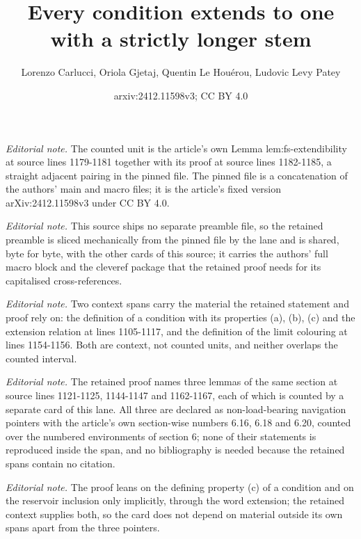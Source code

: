 \documentclass{article}
\title{Every condition extends to one with a strictly longer stem}
\author{Lorenzo Carlucci, Oriola Gjetaj, Quentin Le Houérou, Ludovic Levy Patey}
\date{arxiv:2412.11598v3; CC BY 4.0}
\numberwithin{theorem}{section}
\begin{document}
\maketitle
\noindent\textit{Editorial note.} The counted unit is the article's own Lemma lem:fs-extendibility at source lines 1179-1181 together with its proof at source lines 1182-1185, a straight adjacent pairing in the pinned file. The pinned file is a concatenation of the authors' main and macro files; it is the article's fixed version arXiv:2412.11598v3 under CC BY 4.0.\par\medskip
\noindent\textit{Editorial note.} This source ships no separate preamble file, so the retained preamble is sliced mechanically from the pinned file by the lane and is shared, byte for byte, with the other cards of this source; it carries the authors' full macro block and the cleveref package that the retained proof needs for its capitalised cross-references.\par\medskip
\noindent\textit{Editorial note.} Two context spans carry the material the retained statement and proof rely on: the definition of a condition with its properties (a), (b), (c) and the extension relation at lines 1105-1117, and the definition of the limit colouring at lines 1154-1156. Both are context, not counted units, and neither overlaps the counted interval.\par\medskip
\noindent\textit{Editorial note.} The retained proof names three lemmas of the same section at source lines 1121-1125, 1144-1147 and 1162-1167, each of which is counted by a separate card of this lane. All three are declared as non-load-bearing navigation pointers with the article's own section-wise numbers 6.16, 6.18 and 6.20, counted over the numbered environments of section 6; none of their statements is reproduced inside the span, and no bibliography is needed because the retained spans contain no citation.\par\medskip
\noindent\textit{Editorial note.} The proof leans on the defining property (c) of a condition and on the reservoir inclusion only implicitly, through the word extension; the retained context supplies both, so the card does not depend on material outside its own spans apart from the three pointers.\par\medskip
\end{document}
